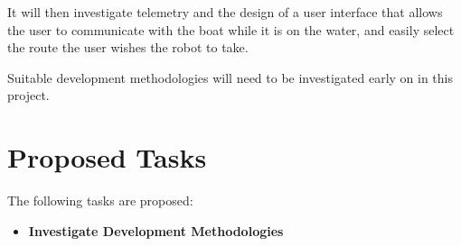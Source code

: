 \documentclass[titlepage 12pt]{article}
\begin{document}
{It will then investigate telemetry and the design of a user interface that allows the user to communicate with the boat while it is on the water, and easily select the route the user wishes the robot to take. 

\cite{mmp}
          
Suitable development methodologies will need to be investigated early on in this project.

\section{Proposed Tasks}
The following tasks are proposed:
\begin{itemize}
\item \textbf{Investigate Development Methodologies}


\end{itemize}}
\end{document}
